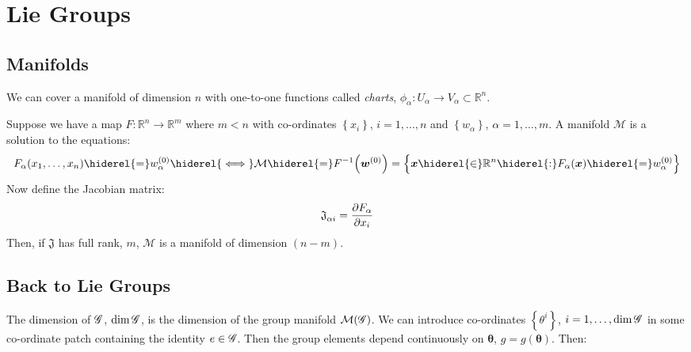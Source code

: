 \section{Lie Groups}

\subsection{Manifolds}

We can cover a manifold of dimension $n$ with one-to-one functions called \emph{charts}, $\phi_{\alpha} : U_{\alpha} \rightarrow V_{\alpha} \subset \mathbb{R}^n$.

\begin{thm}\label{thm:manifold}
Suppose we have a map $F : \mathbb{R}^n \rightarrow \mathbb{R}^m$ where $m<n$ with co-ordinates $\left\{ x_i \right\}$, $i = 1, \ldots, n$ and $\left\{ w_{\alpha} \right\}$, $\alpha = 1, \ldots, m$. A manifold $\mathcal{M}$ is a solution to the equations:
\begin{dmath}
F_{\alpha}\left( x_1, \ldots, x_n \right) \hiderel{=} w^{(0)}_{\alpha} \hiderel{\iff} \mathcal{M} \hiderel{=} F^{-1}\left( \bm{w}^{(0)} \right) = \left\{ \bm{x} \hiderel{\in} \mathbb{R}^n \hiderel{:} F_{\alpha}\left( \bm{x} \right) \hiderel{=} w^{(0)}_{\alpha} \right\}
\end{dmath}
Now define the Jacobian matrix:
\begin{equation}
\mathfrak{J}\indices{_{\alpha i}}=\frac{\partial F_{\alpha}}{\partial x_i}
\end{equation}
Then, if $\mathfrak{J}$ has full rank, $m$, $\mathcal{M}$ is a manifold of dimension $(n-m)$.
\end{thm}

\subsection{Back to Lie Groups}

The dimension of $\mathscr{G}$, $\dim \mathscr{G}$, is the dimension of the group manifold $\mathcal{M}\left( \group \right)$. We can introduce co-ordinates $\left\{ \theta^i \right\}$, $i = 1, \ldots, \dim \mathscr{G}$ in some co-ordinate patch containing the identity $e \in \mathscr{G}$. Then the group elements depend continuously on $\bm{\theta}$, $g = g(\bm{\theta})$. Then:

